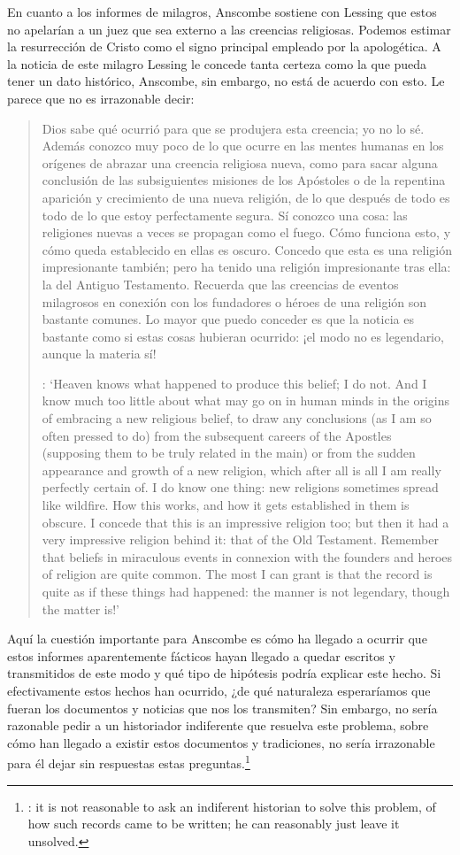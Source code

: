En cuanto a los informes de milagros, Anscombe sostiene con Lessing que estos no
apelarían a un juez que sea externo a las creencias religiosas. Podemos estimar
la resurrección de Cristo como el signo principal empleado por la apologética. A
la noticia de este milagro Lessing le concede tanta certeza como la que pueda
tener un dato histórico, Anscombe, sin embargo, no está de acuerdo con esto. Le
parece que no es irrazonable decir:
\blockquote[{\cite[26]{anscombe2008faith:prophandmi}}: `Heaven knows what
happened to produce this belief; I do not. And I know much too little about what
may go on in human minds in the origins of embracing a new religious belief, to
draw any conclusions (as I am so often pressed to do) from the subsequent
careers of the Apostles (supposing them to be truly related in the main) or from
the sudden appearance and growth of a new religion, which after all is all I am
really perfectly certain of. I do know one thing: new religions sometimes spread
like wildfire. How this works, and how it gets established in them is obscure. I
concede that this is an impressive religion too; but then it had a very
impressive religion behind it: that of the Old Testament. Remember that beliefs
in miraculous events in connexion with the founders and heroes of religion are
quite common. The most I can grant is that the record is quite as if these
things had happened: the manner is not legendary, though the matter is!']{Dios
  sabe qué ocurrió para que se produjera esta creencia; yo no lo sé. Además
  conozco muy poco de lo que ocurre en las mentes humanas en los orígenes de
  abrazar una creencia religiosa nueva, como para sacar alguna conclusión
  \textelp{} de las subsiguientes misiones de los Apóstoles \textelp{} o de la
  repentina aparición y crecimiento de una nueva religión, de lo que después de
  todo es todo de lo que estoy perfectamente segura. Sí conozco una cosa: las
  religiones nuevas a veces se propagan como el fuego. Cómo funciona esto, y
  cómo queda establecido en ellas es oscuro. Concedo que esta es una religión
  impresionante también; pero ha tenido una religión impresionante tras ella: la
  del Antiguo Testamento. Recuerda que las creencias de eventos milagrosos en
  conexión con los fundadores o héroes de una religión son bastante comunes. Lo
  mayor que puedo conceder es que la noticia es bastante como si estas cosas
  hubieran ocurrido: ¡el modo no es legendario, aunque la materia sí!}

Aquí la cuestión importante para Anscombe es cómo ha llegado a ocurrir que estos
informes aparentemente fácticos hayan llegado a quedar escritos y transmitidos
de este modo y qué tipo de hipótesis podría explicar este hecho. Si
efectivamente estos hechos han ocurrido, ¿de qué naturaleza esperaríamos que
fueran los documentos y noticias que nos los transmiten? Sin embargo, no sería
razonable pedir a un historiador indiferente que resuelva este problema, sobre
cómo han llegado a existir estos documentos y tradiciones, no sería irrazonable
para él dejar sin respuestas estas
preguntas.\footnote{\cite[Cf.~][37]{anscombe2008faith:prophandmi}: it is not
  reasonable to ask an indiferent historian to solve this problem, of how such
  records came to be written; he can reasonably just leave it unsolved.}

